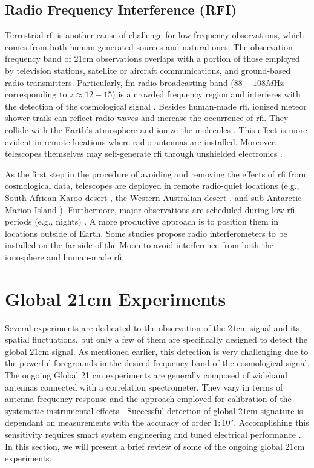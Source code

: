 \documentclass[12pt, TexShade, letterpaper]{report}
\begin{document}
\subsection{Radio Frequency Interference (RFI)}
Terrestrial \gls{rfi} is another cause of challenge for low-frequency observations, which comes from both human-generated sources and natural ones. The observation frequency band of 21cm observations overlaps with a portion of those employed by television stations, satellite or aircraft communications, and ground-based radio transmitters. Particularly, \gls{fm} radio broadcasting band ($88-108M\mathrm{Hz}$ corresponding to $z \approx 12-15$) is a crowded frequency region and interferes with the detection of the cosmological signal \cite{sci-hi_1}. 
Besides human-made \gls{rfi}, ionized meteor shower trails can reflect radio waves and increase the occurrence of \gls{rfi}. They collide with the Earth's atmosphere and ionize the molecules \cite{prizm_thesis}. This effect is more evident in remote locations where radio antennas are installed. Moreover, telescopes themselves may self-generate \gls{rfi} through unshielded electronics \cite{thesis_pamela}. \par
As the first step in the procedure of avoiding and removing the effects of \gls{rfi} from cosmological data, telescopes are deployed in remote radio-quiet locations (e.g., South African Karoo desert \cite{reach_design}, the Western Australian desert \cite{edges}, and sub-Antarctic Marion Island \cite{prizm_2017, prizm_thesis, rfi_1}). Furthermore, major observations are scheduled during low-\gls{rfi} periods (e.g., nights) \cite{leda_design}. A more productive approach is to position them in locations outside of Earth. Some studies propose radio interferometers to be installed on the far side of the Moon \cite{lunar_far_side, global_moon_far_side} to avoid interference from both the ionosphere and human-made \gls{rfi} \cite{thesis_pamela}. \par
\section{Global 21cm Experiments}
Several experiments are dedicated to the observation of the $\mathrm{21cm}$ signal and its spatial fluctuations, but only a few of them are specifically designed to detect the global $\mathrm{21cm}$ signal. As mentioned earlier, this detection is very challenging due to the powerful foregrounds in the desired frequency band of the cosmological signal. The ongoing Global 21 cm experiments are generally composed of wideband antennas connected with a correlation spectrometer. They vary in terms of antenna frequency response and the approach employed for calibration of the systematic instrumental effects \cite{hyperion_1}. Successful detection of global $\mathrm{21cm}$ signature is dependant on measurements with the accuracy of order $1:10^5$. Accomplishing this sensitivity requires smart system engineering and tuned electrical performance \cite{hyperion_2}. In this section, we will present a brief review of some of the ongoing global $\mathrm{21cm}$ experiments.\par
\end{document}
